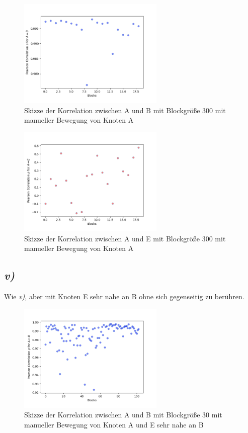 \documentclass[12pt,a4paper]{article}
\begin{document}
\begin{figure}[hbt!]
	\centering
		\includegraphics[width=0.62\textwidth ]
		{Bilder/a3-t4-block300-correlation-AB.png}
		\caption{Skizze der Korrelation zwischen A und B mit Blockgröße 300 mit manueller Bewegung von Knoten A}
		\label{fig:Label16}
\end{figure}

\begin{figure}[hbt!]
	\centering
		\includegraphics[width=0.62\textwidth ]
		{Bilder/a3-t4-block300-correlation-AE.png}
		\caption{Skizze der Korrelation zwischen A und E mit Blockgröße 300 mit manueller Bewegung von Knoten A}
		\label{fig:Label17}
\end{figure}
\clearpage




\subsection*{\textit{v)}}
Wie \textit{v)}, aber mit Knoten E sehr nahe an B ohne sich 
gegenseitig zu berühren.


\begin{figure}[hbt!]
	\centering
		\includegraphics[width=0.62\textwidth ]
		{Bilder/a3-t5-block30-correlation-AB.png}
		\caption{Skizze der Korrelation zwischen A und B mit Blockgröße 30 mit manueller Bewegung von Knoten A und E sehr nahe an B}
		\label{fig:Label18}
\end{figure}
\end{document}
